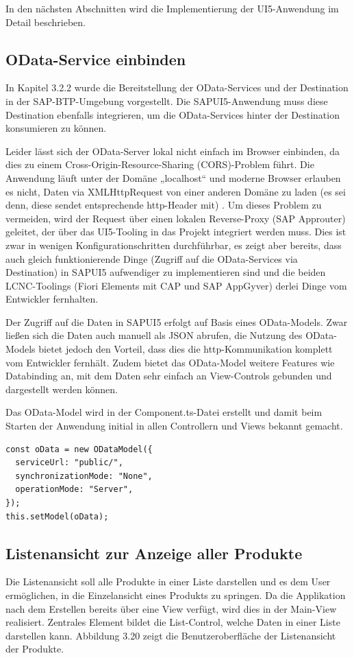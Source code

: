 In den nächsten Abschnitten wird die Implementierung der UI5-Anwendung im Detail beschrieben. 

\subsection{OData-Service einbinden}

In Kapitel 3.2.2 wurde die Bereitstellung der OData-Services und der Destination in der SAP-BTP-Umgebung vorgestellt. Die SAPUI5-Anwendung muss diese Destination ebenfalls integrieren, um die OData-Services hinter der Destination konsumieren zu können. 

Leider lässt sich der OData-Server lokal nicht einfach im Browser einbinden, da dies zu einem Cross-Origin-Resource-Sharing (CORS)-Problem führt. Die Anwendung läuft unter der Domäne „localhost“ und moderne Browser erlauben es nicht, Daten via XMLHttpRequest von einer anderen Domäne zu laden (es sei denn, diese sendet entsprechende http-Header mit) \cite{sud:s25}. Um dieses Problem zu vermeiden, wird der Request über einen lokalen Reverse-Proxy (SAP Approuter) geleitet, der über das UI5-Tooling in das Projekt integriert werden muss. Dies ist zwar in wenigen Konfigurationschritten durchführbar, es zeigt aber bereits, dass auch gleich funktionierende Dinge (Zugriff auf die OData-Services via Destination) in SAPUI5 aufwendiger zu implementieren sind und die beiden LCNC-Toolings (Fiori Elements mit CAP und SAP AppGyver) derlei Dinge vom Entwickler fernhalten.

Der Zugriff auf die Daten in SAPUI5 erfolgt auf Basis eines OData-Models. Zwar ließen sich die Daten auch manuell als JSON abrufen, die Nutzung des OData-Models bietet jedoch den Vorteil, dass dies die http-Kommunikation komplett vom Entwickler fernhält. Zudem bietet das OData-Model weitere Features wie Databinding an, mit dem Daten sehr einfach an View-Controls gebunden und dargestellt werden können. 

Das OData-Model wird in der Component.ts-Datei erstellt und damit beim Starten der Anwendung initial in allen Controllern und Views bekannt gemacht.

\begin{lstlisting}[emph={oData},  caption=Auszüge aus der \texttt{Component.ts}]
const oData = new ODataModel({
  serviceUrl: "public/",
  synchronizationMode: "None",
  operationMode: "Server",
});
this.setModel(oData);
\end{lstlisting}

\subsection{Listenansicht zur Anzeige aller Produkte}
Die Listenansicht soll alle Produkte in einer Liste darstellen und es dem User ermöglichen, in die Einzelansicht eines Produkts zu springen. Da die Applikation nach dem Erstellen bereits über eine View verfügt, wird dies in der Main-View realisiert. Zentrales Element bildet die List-Control, welche Daten in einer Liste darstellen kann. Abbildung 3.20 zeigt die Benutzeroberfläche der Listenansicht der Produkte.

